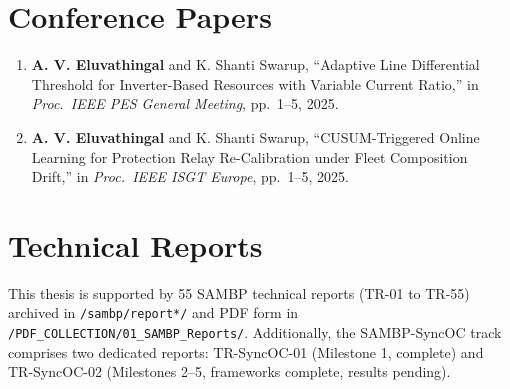 \section*{Conference Papers}

\begin{enumerate}

\item \textbf{A. V. Eluvathingal} and K. Shanti Swarup,
  ``Adaptive Line Differential Threshold for Inverter-Based Resources
  with Variable Current Ratio,''
  in \textit{Proc.\ IEEE PES General Meeting}, pp.~1--5, 2025.

\item \textbf{A. V. Eluvathingal} and K. Shanti Swarup,
  ``CUSUM-Triggered Online Learning for Protection Relay Re-Calibration
  under Fleet Composition Drift,''
  in \textit{Proc.\ IEEE ISGT Europe}, pp.~1--5, 2025.

\end{enumerate}

\section*{Technical Reports}

This thesis is supported by 55 SAMBP technical reports (TR-01 to TR-55)
archived in \texttt{/sambp/report*/} and PDF form in
\texttt{/PDF\_COLLECTION/01\_SAMBP\_Reports/}. Additionally, the SAMBP-SyncOC
track comprises two dedicated reports:
TR-SyncOC-01 (Milestone 1, complete) and TR-SyncOC-02 (Milestones 2--5,
frameworks complete, results pending).

